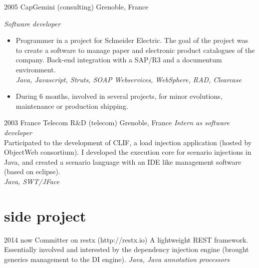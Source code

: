 \documentclass[]{k-cv} %
\begin{document}
\clearpage


\begin{entrylist}

\entry
{2005 }
{CapGemini (consulting)}
{Grenoble, France}
{\emph{Software developer}
\begin{itemize}
\item
Programmer in a project for Schneider Electric.
The goal of the project was to create a software to manage paper and electronic product
catalogues of the company.
Back-end integration with a SAP/R3 and a documentum environment. \\
\emph{Java, Javascript, Struts, SOAP Webservices, WebSphere, RAD, Clearcase}
\item
During 6 months, involved in several projects, for minor evolutions, maintenance or production shipping.
\end{itemize}}
\entry
{2003 }
{France Telecom R\&D (telecom)}
{Grenoble, France}
{\emph{Intern as software developer} \\
Participated to the development of CLIF,
a load injection application (hosted by ObjectWeb consortium).
I developed the execution core for scenario injections in Java,
and created a scenario language with an IDE like management software (based on eclipse). \\
\emph{Java, SWT/JFace}}
\end{entrylist}




\section{side project}

\begin{entrylist}
\entry
{2014 \to now}
{Committer on restx (http://restx.io)}
{}
{A lightweight REST framework.
Essentially involved and interested by the dependency injection engine (brought generics management to the DI engine).
\emph{Java, Java annotation processors}}
\end{entrylist}
\end{document}
